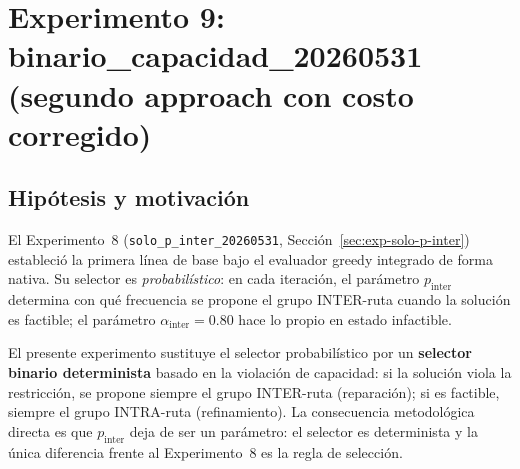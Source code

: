 
\providecommand{\TODO}[1]{\textcolor{rojomalo}{\textbf{[TODO: #1]}}}

\providecommand{\viol}{\mathrm{viol}}

\section{Experimento 9: binario\_capacidad\_20260531 (segundo approach con costo corregido)}
\label{sec:exp-binario-capacidad}

\subsection{Hipótesis y motivación}

El Experimento~8 (\texttt{solo\_p\_inter\_20260531}, Sección~\ref{sec:exp-solo-p-inter})
estableció la primera línea de base bajo el evaluador greedy integrado de
forma nativa. Su selector es \emph{probabilístico}: en cada iteración,
el parámetro $p_{\text{inter}}$ determina con qué frecuencia se propone
el grupo INTER-ruta cuando la solución es factible; el parámetro
$\alpha_{\text{inter}} = 0.80$ hace lo propio en estado infactible.

El presente experimento sustituye el selector probabilístico por un
\textbf{selector binario determinista} basado en la violación de
capacidad: si la solución viola la restricción, se propone siempre el
grupo INTER-ruta (reparación); si es factible, siempre el grupo
INTRA-ruta (refinamiento). La consecuencia metodológica directa es que
$p_{\text{inter}}$ deja de ser un parámetro: el selector es determinista
y la única diferencia frente al Experimento~8 es la regla de selección.

